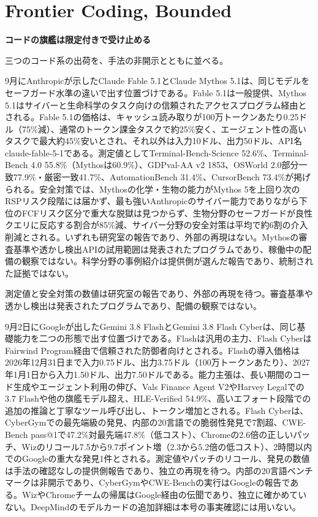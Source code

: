 \section{Frontier Coding, Bounded}
\begin{wideflow}
{\Large\bfseries コードの旗艦は限定付きで受け止める}\par
\smallskip
{\color{SurveyMuted}三つのコード系の出荷を、手法の非開示とともに並べる。}\par
\end{wideflow}

9月にAnthropicが示したClaude Fable 5.1とClaude Mythos 5.1は、同じモデルをセーフガード水準の違いで出す位置づけである\cite{fablemythos}。Fable 5.1は一般提供、Mythos 5.1はサイバーと生命科学のタスク向けの信頼されたアクセスプログラム経由とされる。Fable 5.1の価格は、キャッシュ読み取りが100万トークンあたり0.25ドル（75\%減）、通常のトークン課金タスクで約25\%安く、エージェント性の高いタスクで最大約45\%安いとされ、それ以外は入力10ドル、出力50ドル、API名claude-fable-5-1である。測定値としてTerminal-Bench-Science 52.6\%、Terminal-Bench 4.0 55.8\%（Mythosは60.9\%）、GDPval-AA v2 1853、OSWorld 2.0部分一致77.9\%・厳密一致41.7\%、AutomationBench 31.4\%、CursorBench 73.4\%が掲げられる。安全対策では、Mythosの化学・生物の能力がMythos 5を上回り次のRSPリスク段階には届かず、最も強いAnthropicのサイバー能力でありながら下位のFCFリスク区分で重大な脱獄は見つからず、生物分野のセーフガードが良性クエリに反応する割合が85\%減、サイバー分野の安全対策は平均で約6割の介入削減とされる。いずれも研究室の報告であり、外部の再現はない。Mythosの審査基準や透かし検出APIの試用範囲は発表されたプログラムであり、稼働中の配備の観察ではない。科学分野の事例紹介は提供側が選んだ報告であり、統制された証拠ではない。

\begin{claimboundary}[報告の境界]
測定値と安全対策の数値は研究室の報告であり、外部の再現を待つ。審査基準や透かし検出は発表されたプログラムであり、配備の観察ではない。
\end{claimboundary}

9月2日にGoogleが出したGemini 3.8 FlashとGemini 3.8 Flash Cyberは、同じ基礎能力を二つの形態で出す位置づけである\cite{gemini38flash}。Flashは汎用の主力、Flash CyberはFairwind Program経由で信頼された防御者向けとされる。Flashの導入価格は2026年12月31日まで入力0.75ドル、出力3.75ドル（100万トークンあたり）、2027年1月1日から入力1.50ドル、出力7.50ドルである。能力主張は、長い期間のコード生成やエージェント利用の伸び、Vals Finance Agent V2やHarvey Legalでの3.7 Flashや他の旗艦モデル超え、HLE-Verified 54.9\%、高いエフォート段階での追加の推論と丁寧なツール呼び出し、トークン増加とされる。Flash Cyberは、CyberGymでの最先端級の発見、内部の20言語での脆弱性発見で7割超、CWE-Bench pass@1で47.2\%対最先端47.8\%（低コスト）、Chromeの2.6倍の正しいパッチ、Wizのリコール7.5から9.7ポイント増（2.3から5.2倍の低コスト）、2時間以内でのGoogleの重大な発見1件とされる。測定値やパッチのリコール、発見の数値は手法の確認なしの提供側報告であり、独立の再現を待つ。内部の20言語ベンチマークは非開示であり、CyberGymやCWE-Benchの実行はGoogleの報告である。WizやChromeチームの帰属はGoogle経由の伝聞であり、独立に確かめていない。DeepMindのモデルカードの追加詳細は本号の事実確認には用いない。

